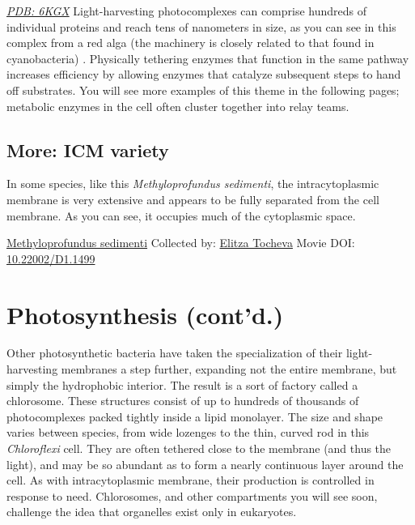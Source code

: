 \documentclass[]{tufte-book}
\begin{document}
\href{http://rcsb.org/structure/6KGX}{\emph{PDB: 6KGX}}
Light-harvesting photocomplexes can comprise hundreds of individual proteins and reach tens of nanometers in size, as you can see in this complex from a red alga (the machinery is closely related to that found in cyanobacteria) \citep{ma2020}. Physically tethering enzymes that function in the same pathway increases efficiency by allowing enzymes that catalyze subsequent steps to hand off substrates. You will see more examples of this theme in the following pages; metabolic enzymes in the cell often cluster together into relay teams.

\hypertarget{ICM_variety}{%
\subsection*{More: ICM variety}\label{ICM_variety}}

In some species, like this \emph{Methyloprofundus sedimenti}, the intracytoplasmic membrane is very extensive and appears to be fully separated from the cell membrane. As you can see, it occupies much of the cytoplasmic space.



\hypertarget{htmlwidget-c7c40af824c1e864814a}{}

\label{fig:4-3a}\protect\hyperlink{tree}{Methyloprofundus sedimenti} Collected by: \protect\hyperlink{elitza_tocheva}{Elitza Tocheva} Movie DOI: \href{https://doi.org/10.22002/D1.1499}{10.22002/D1.1499}

\hypertarget{photosynthesis-contd.}{%
\section{Photosynthesis (cont'd.)}\label{photosynthesis-contd.}}

Other photosynthetic bacteria have taken the specialization of their light-harvesting membranes a step further, expanding not the entire membrane, but simply the hydrophobic interior. The result is a sort of factory called a chlorosome. These structures consist of up to hundreds of thousands of photocomplexes packed tightly inside a lipid monolayer. The size and shape varies between species, from wide lozenges to the thin, curved rod in this \emph{Chloroflexi} cell. They are often tethered close to the membrane (and thus the light), and may be so abundant as to form a nearly continuous layer around the cell. As with intracytoplasmic membrane, their production is controlled in response to need. Chlorosomes, and other compartments you will see soon, challenge the idea that organelles exist only in eukaryotes.
\end{document}
